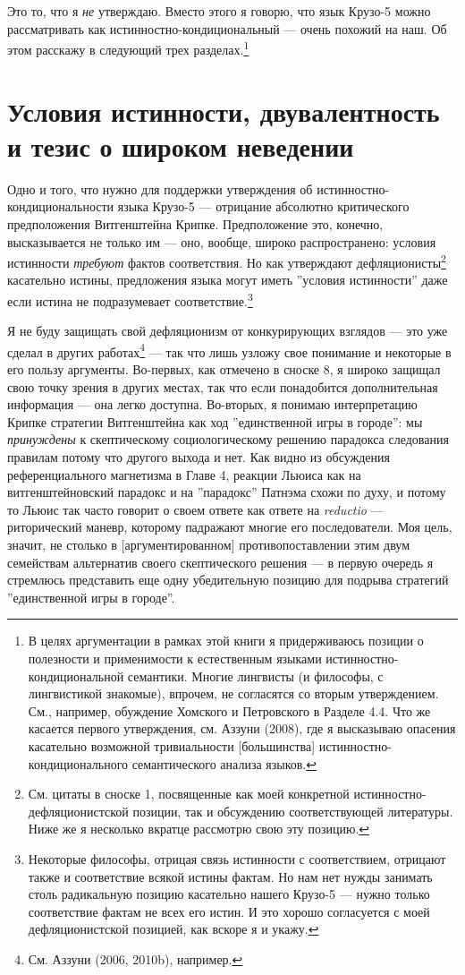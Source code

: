 \documentclass[11pt]{book}
\begin{document}
Это то, что я \textit{не} утверждаю. Вместо этого я говорю, что язык Крузо-5 можно рассматривать как истинностно-кондициональный --- очень похожий на наш. Об этом расскажу в следующий трех разделах.\footnote{В целях аргументации в рамках этой книги я придерживаюсь позиции о полезности и применимости к естественным языками истинностно-кондициональной семантики. Многие лингвисты (и философы, с лингвистикой знакомые), впрочем, не согласятся со вторым утверждением. См., например, обуждение Хомского и Петровского в Разделе 4.4. Что же касается первого утверждения, см. Аззуни (2008), где я высказываю опасения касательно возможной тривиальности [большинства] истинностно-кондиционального семантического анализа языков.}

\section{Условия истинности, двувалентность и тезис о широком неведении}

Одно и того, что нужно для поддержки утверждения об истинностно-кондициональности языка Крузо-5 --- отрицание абсолютно критического предположения Витгенштейна Крипке. Предположение это, конечно, высказывается не только им --- оно, вообще, широко распространено: условия истинности \textit{требуют} фактов соответствия. Но как утверждают дефляционисты\footnote{См. цитаты в сноске 1, посвященные как моей конкретной истинностно-дефляционистской позиции, так и обсуждению соответствующей литературы. Ниже же я несколько вкратце рассмотрю свою эту позицию.} касательно истины, предложения языка могут иметь ''условия истинности'' даже если истина не подразумевает соответствие.\footnote{Некоторые философы, отрицая связь истинности с соответствием, отрицают также и соответствие всякой истины фактам. Но нам нет нужды занимать столь радикальную позицию касательно нашего Крузо-5 --- нужно только соответствие фактам не всех его истин. И это хорошо согласуется с моей дефляционистской позицией, как вскоре я и укажу.}

Я не буду защищать свой дефляционизм от конкурирующих взглядов --- это уже сделал в других работах\footnote{См. Аззуни (2006, 2010b), например.} --- так что лишь узложу свое понимание и некоторые в его пользу аргументы. Во-первых, как отмечено в сноске 8, я широко защищал свою точку зрения в других местах, так что если понадобится дополнительная информация --- она легко доступна. Во-вторых, я понимаю интерпретацию Крипке стратегии Витгенштейна как ход ''единственной игры в городе'': мы \textit{принуждены} к скептическому социологическому решению парадокса следования правилам потому что другого выхода и нет. Как видно из обсуждения референциального магнетизма в Главе 4, реакции Льюиса как на витгенштейновский парадокс и на ''парадокс'' Патнэма схожи по духу, и потому то Льюис так часто говорит о своем ответе как ответе на \textit{reductio} --- риторический маневр, которому падражают многие его последователи. Моя цель, значит, не столько в [аргументированном] противопоставлении этим двум семействам альтернатив своего скептического решения --- в первую очередь я стремлюсь представить еще одну убедительную позицию для подрыва стратегий ''единственной игры в городе''.
\end{document}
